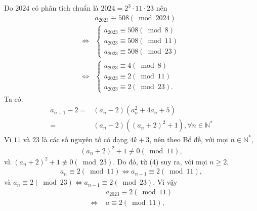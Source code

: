 \begin{multicols}{2}
	\vskip 0.05cm
	Do $2024$ có phân tích chuẩn là  $2024 = 2^3\cdot 11\cdot23$ nên
	\begin{align*}
		&{a_{2023}} \equiv 508\left( {\bmod 2024} \right) \\
		\Leftrightarrow &\left\{ \begin{array}{l}
			{a_{2023}} \equiv 508\left( {\bmod 8} \right)\\
			{a_{2023}} \equiv 508\left( {\bmod 11} \right)\\
			{a_{2023}} \equiv 508\left( {\bmod 23} \right)
		\end{array} \right. \\
	\Leftrightarrow &\left\{ \begin{array}{l}
			{a_{2023}} \equiv 4\left( {\bmod 8} \right)\\
			{a_{2023}} \equiv 2\left( {\bmod 11} \right)\\
			{a_{2023}} \equiv 2\left( {\bmod 23} \right).
		\end{array} \right. \tag{$3$}
	\end{align*}
	Ta có:
	\begin{align*}
		{a_{n + 1}} - 2 = &\left( {{a_n} - 2} \right)\left( {a_n^2 + 4{a_n} + 5} \right) \\
		= &\left( {{a_n} \!-\! 2} \right)\left( {{{\left( {{a_n} \!+\! 2} \right)}^2} \!+\! 1} \right),\forall n \in  \mathbb{N^*}
	\end{align*}
	Vì $11$ và $23$ là các số nguyên tố có dạng $4k + 3$, nên theo Bổ đề, với mọi $n \in \mathbb{N^*}$, 
	\begin{align*}
		{\left( {{a_n} + 2} \right)^2} + 1\not  \equiv 0\left( {\bmod 11} \right),
	\end{align*}
	và   ${\left( {{a_n} + 2} \right)^2} + 1\not  \equiv 0\left( {\bmod 23} \right).$
	\vskip 0.05cm                                                    
	Do đó, từ ($4$) suy ra, với mọi $n \ge  2$,
	\begin{align*}
		{a_n} \equiv 2\left( {\bmod 11} \right) \Leftrightarrow {a_{n - 1}} \equiv 2\left( {\bmod 11} \right),
	\end{align*}
	và  ${a_n} \equiv 2\left( {\bmod 23} \right) \Leftrightarrow {a_{n - 1}} \equiv 2\left( {\bmod 23} \right).$
	\vskip 0.05cm                                           
	Vì vậy
	\begin{align*}
		&{a_{2023}} \equiv 2\left( {\bmod 11} \right) \\
		\Leftrightarrow \,\,&a \equiv 2\left( {\bmod 11} \right), \tag{$5$}
	\end{align*}

\end{multicols}
